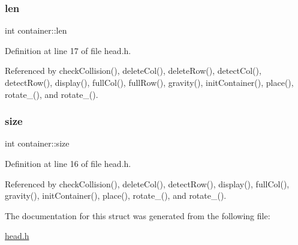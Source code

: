 \mbox{\label{structcontainer_a0069496fb95c879cd33fb79ab726e81a}} 
\subsubsection{\texorpdfstring{len}{len}}
{\footnotesize\ttfamily int container\+::len}



Definition at line 17 of file head.\+h.



Referenced by check\+Collision(), delete\+Col(), delete\+Row(), detect\+Col(), detect\+Row(), display(), full\+Col(), full\+Row(), gravity(), init\+Container(), place(), rotate\+\_(), and rotate\+\_().

\mbox{\label{structcontainer_a1e938d250074e70b9778df1b59121744}} 
\subsubsection{\texorpdfstring{size}{size}}
{\footnotesize\ttfamily int container\+::size}



Definition at line 16 of file head.\+h.



Referenced by check\+Collision(), delete\+Col(), detect\+Row(), display(), full\+Col(), gravity(), init\+Container(), place(), rotate\+\_(), and rotate\+\_().



The documentation for this struct was generated from the following file\+:\begin{DoxyCompactItemize}
\item 
\hyperlink{head_8h}{head.\+h}\end{DoxyCompactItemize}
